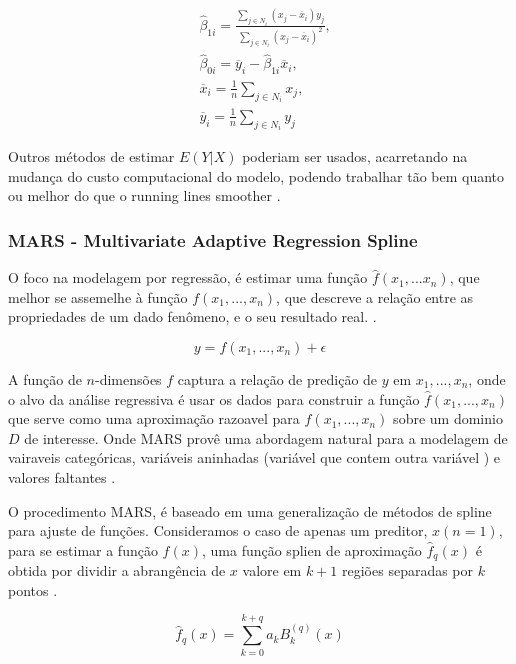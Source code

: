 \documentclass[
	12pt,				%
	openright,			%
	oneside,			%
	a4paper,			%
	english,			%
	brazil				%
	]{abntex2}
\begin{document}
\begin{equation}
	\label{least_square_betas}
	\begin{split}
		&\hat{\beta}_{1i} = \frac{\sum_{j \in N_i}(x_j - \overline{x}_i)y_j}{\sum_{j \in N_i}(x_j - \overline{x}_i)^2}, \\
		&\hat{\beta}_{0i} = \overline{y}_i - \hat{\beta}_{1i}\overline{x}_i, \\
		&\overline{x}_i = \frac{1}{n}\sum_{j \in N_i}x_j, \\
		&\overline{y}_i = \frac{1}{n}\sum_{j \in N_i}y_j
	\end{split}
\end{equation}

Outros métodos de estimar $E(Y|X)$ poderiam ser usados, acarretando na mudança do custo computacional do modelo, podendo
trabalhar tão bem quanto ou melhor do que o running lines smoother \cite{GAM}.

\subsubsection{MARS - Multivariate Adaptive Regression Spline}

O foco na modelagem por regressão, é estimar uma função $\hat{f}(x_1,...x_n)$, que melhor se assemelhe à função 
$f(x_1,...,x_n)$, que descreve a relação entre as propriedades de um dado fenômeno, e o seu resultado real.
\cite{MARS}. 

\begin{equation}
	\label{mars_eq_base}
	y = f(x_1,...,x_n) + \epsilon
\end{equation}

A função de $n$-dimensões $f$ captura a relação de predição de $y$ em $x_1,...,x_n$, onde o alvo da análise regressiva
é usar os dados para construir a função $\hat{f}(x_1,...,x_n)$ que serve como uma aproximação razoavel para
$f(x_1,...,x_n)$ sobre um dominio $D$ de interesse. Onde MARS provê uma abordagem natural para a modelagem de vairaveis
categóricas, variáveis aninhadas (variável que contem outra variável ) e valores faltantes \cite{intro_mars}.

O procedimento MARS, é baseado em uma generalização de métodos de spline para ajuste de funções. Consideramos o caso de
apenas um preditor, $x (n = 1)$, para se estimar a função $f(x)$, uma função splien de aproximação $\hat{f}_q(x)$ é obtida por
dividir a abrangência de $x$ valore em $k+1$ regiões separadas por $k$ pontos \cite{intro_mars}.

\begin{equation}
	\label{funcao_spline_aproximacao}
	\hat{f}_q(x) = \sum_{k=0}^{k+q}a_kB_k^{(q)}(x)
\end{equation}
\end{document}

